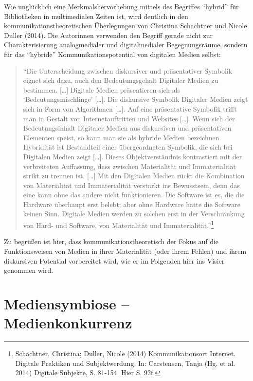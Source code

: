 \documentclass[a4paper,
fontsize=11pt,
oneside,
numbers=noperiodatend,
parskip=half-,
bibliography=totoc,
final
]{scrartcl}
\begin{document}
Wie unglücklich eine Merkmalshervorhebung mittels des Begriffes
\enquote{hybrid} für Bibliotheken in multimedialen Zeiten ist, wird
deutlich in den kommunikationstheoretischen Überlegungen von Christina
Schachtner und Nicole Duller (2014). Die Autorinnen verwenden den
Begriff gerade nicht zur Charakterisierung analogmedialer und
digitalmedialer Begegnungsräume, sondern für das \enquote{hybride}
Kommunikationspotential von digitalen Medien selbst:

\begin{quote}
\enquote{Die Unterscheidung zwischen diskursiver und präsentativer
Symbolik eignet sich dazu, auch den Bedeutungsgehalt Digitaler Medien zu
bestimmen. {[}\ldots{}{]} Digitale Medien präsentieren sich als
\enquote{Bedeutungsmischlinge} {[}\ldots{}{]}. Die diskursive Symbolik
Digitaler Medien zeigt sich in Form von Algorithmen {[}\ldots{}{]}. Auf
eine präsentative Symbolik trifft man in Gestalt von Internetauftritten
und Websites {[}\ldots{}{]}. Wenn sich der Bedeutungsinhalt Digitaler
Medien aus diskursiven und präsentativen Elementen speist, so kann man
sie als hybride Medien bezeichnen. Hybridität ist Bestandteil einer
übergeordneten Symbolik, die sich bei Digitalen Medien zeigt
{[}\ldots{}{]}. Dieses Objektverständnis kontrastiert mit der
verbreiteten Auffassung, dass zwischen Materialität und Immaterialität
strikt zu trennen ist. {[}\ldots{}{]} Mit den Digitalen Medien rückt die
Kombination von Materialität und Immaterialität verstärkt ins
Bewusstsein, denn das eine kann ohne das andere nicht funktionieren. Die
Software ist es, die die Hardware überhaupt erst belebt; aber ohne
Hardware hätte die Software keinen Sinn. Digitale Medien werden zu
solchen erst in der Verschränkung von Hard- und Software, von
Materialität und Immaterialität.}\footnote{Schachtner, Christina;
  Duller, Nicole (2014) Kommunikationsort Internet. Digitale Praktiken
  und Subjektwerdung. In: Carstensen, Tanja (Hg. et al. 2014) Digitale
  Subjekte, S. 81-154. Hier S. 92f.}
\end{quote}

Zu begrüßen ist hier, dass kommunikationstheoretisch der Fokus auf die
Funktionsweisen von Medien in ihrer Materialität (oder ihrem Fehlen) und
ihrem diskursiven Potential vorbereitet wird, wie er im Folgenden hier
ins Visier genommen wird.

\section*{Mediensymbiose --
Medienkonkurrenz}\label{mediensymbiose-medienkonkurrenz}
\end{document}
